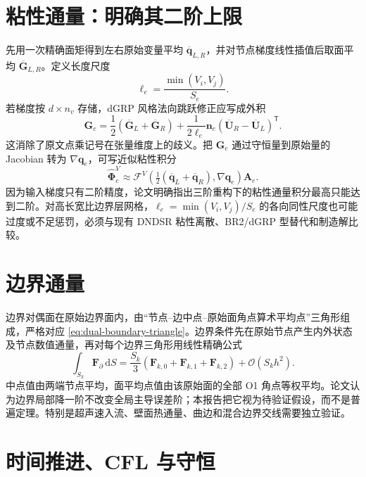 \documentclass[UTF8,a4paper,11pt,openany]{ctexrep}
\numberwithin{equation}{chapter}
\newcommand{\dd}{\,\mathrm d}
\newcommand{\Order}{\mathcal O}
\newcommand{\Flux}{\bm{\mathcal F}}
\newcommand{\grad}{\nabla}
\newcommand{\transpose}{\mathsf T}
\begin{document}
\section{粘性通量：明确其二阶上限}

先用一次精确面矩得到左右原始变量平均 $\overline{\bm q}_{L,R}$，并对节点梯度线性插值后取面平均 $\overline{\bm G}_{L,R}$。定义长度尺度
\begin{equation}
  \ell_e=\frac{\min(V_i,V_j)}{S_e}.
\end{equation}
若梯度按 $d\times n_v$ 存储，dGRP 风格法向跳跃修正应写成外积
\begin{equation}
  \bm G_e
  =\frac12(\overline{\bm G}_L+\overline{\bm G}_R)
   +\frac{1}{2\ell_e}\bm n_e
    (\overline{\bm U}_R-\overline{\bm U}_L)^{\transpose}.
  \label{eq:dgrp}
\end{equation}
这消除了原文点乘记号在张量维度上的歧义。把 $\bm G_e$ 通过守恒量到原始量的 Jacobian 转为 $\grad\bm q_e$，可写近似粘性积分
\begin{equation}
  \widehat{\bm\Phi}^{V}_e
  \approx \Flux^V\!\left(
    \tfrac12(\overline{\bm q}_L+\overline{\bm q}_R),
    \grad\bm q_e\right)\bm A_e.
  \label{eq:viscflux}
\end{equation}
因为输入梯度只有二阶精度，论文明确指出三阶重构下的粘性通量积分最高只能达到二阶。对高长宽比边界层网格，$\ell_e=\min(V_i,V_j)/S_e$ 的各向同性尺度也可能过度或不足惩罚，必须与现有 DNDSR 粘性离散、BR2/dGRP 型替代和制造解比较。

\section{边界通量}

边界对偶面在原始边界面内，由“节点--边中点--原始面角点算术平均点”三角形组成，严格对应 \cref{eq:dual-boundary-triangle}。边界条件先在原始节点产生内外状态及节点数值通量，再对每个边界三角形用线性精确公式
\begin{equation}
  \int_{S_k}\bm F_{\partial}\dd S
  =\frac{S_k}{3}\left(
    \bm F_{k,0}+\bm F_{k,1}+\bm F_{k,2}\right)
  +\Order(S_kh^2).
  \label{eq:bndlinear}
\end{equation}
中点值由两端节点平均，面平均点值由该原始面的全部 O1 角点等权平均。论文认为边界局部降一阶不改变全局主导误差阶；本报告把它视为待验证假设，而不是普遍定理。特别是超声速入流、壁面热通量、曲边和混合边界交线需要独立验证。

\section{时间推进、CFL 与守恒}
\end{document}
